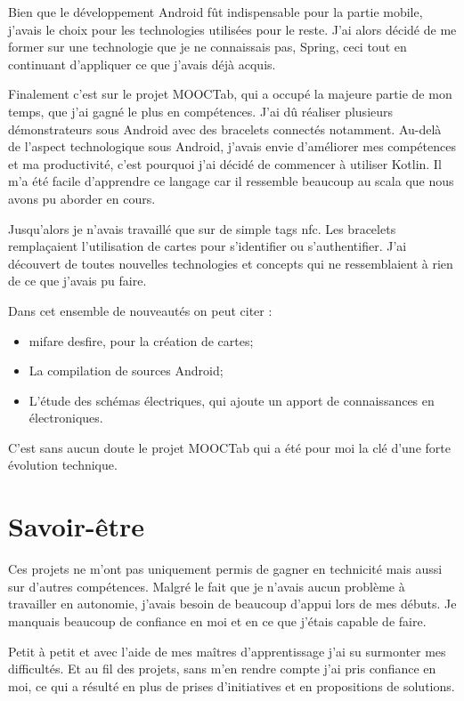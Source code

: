 \documentclass[french,12pt,a4paper,titlepage,openright,openbib]{report}
\begin{document}
Bien que le développement Android fût indispensable pour la partie mobile, j'avais le choix pour les technologies utilisées pour le reste. J'ai alors décidé de me former sur une technologie que je ne connaissais pas, Spring, ceci tout en continuant d'appliquer ce que j'avais déjà acquis.

Finalement c'est sur le projet MOOCTab, qui a occupé la majeure partie de mon temps, que j'ai gagné le plus en compétences. J'ai dû réaliser plusieurs démonstrateurs sous Android avec des bracelets connectés notamment.
Au-delà de l'aspect technologique sous Android, j'avais envie d'améliorer mes compétences et ma productivité, c'est pourquoi j'ai décidé de commencer à utiliser Kotlin. Il m'a été facile d'apprendre ce langage car il ressemble beaucoup au scala que nous avons pu aborder en cours. 

Jusqu'alors je n'avais travaillé que sur de simple tags \gls{nfc}. Les bracelets remplaçaient l'utilisation de cartes pour s'identifier ou s'authentifier. J'ai découvert de toutes nouvelles technologies et concepts qui ne ressemblaient à rien de ce que j'avais pu faire.
\par
Dans cet ensemble de nouveautés on peut citer :
\begin{itemize}
\item \gls{mifare} \gls{desfire}, pour la création de cartes;
\item La compilation de sources Android;
\item L'étude des schémas électriques, qui ajoute un apport de connaissances en électroniques.
\end{itemize}

\par

C'est sans aucun doute le projet MOOCTab qui a été pour moi la clé d'une forte évolution technique.
\section{Savoir-être}
Ces projets ne m'ont pas uniquement permis de gagner en technicité mais aussi sur d'autres compétences.
Malgré le fait que je n'avais aucun problème à travailler en autonomie, j'avais besoin de beaucoup d'appui lors de mes débuts. Je manquais beaucoup de confiance en moi et en ce que j'étais capable de faire.

Petit à petit et avec l'aide de mes maîtres d'apprentissage j'ai su surmonter mes difficultés.
Et au fil des projets, sans m'en rendre compte j'ai pris confiance en moi, ce qui a résulté en plus de prises d'initiatives et en propositions de solutions.
\end{document}
